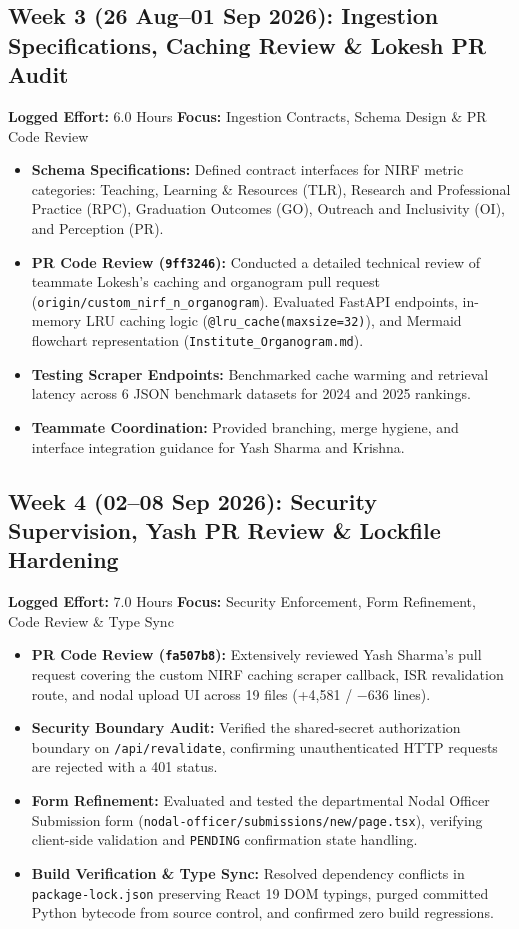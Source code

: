 \documentclass[11pt,a4paper]{article}
\begin{document}
\subsection*{Week 3 (26 Aug--01 Sep 2026): Ingestion Specifications, Caching Review \& Lokesh PR Audit}
\textbf{Logged Effort:} 6.0 Hours \quad \textbf{Focus:} Ingestion Contracts, Schema Design \& PR Code Review
\begin{itemize}[leftmargin=1.4em, itemsep=2pt]
\item \textbf{Schema Specifications:} Defined contract interfaces for NIRF metric categories: Teaching, Learning \& Resources (TLR), Research and Professional Practice (RPC), Graduation Outcomes (GO), Outreach and Inclusivity (OI), and Perception (PR).
\item \textbf{PR Code Review (\texttt{9ff3246}):} Conducted a detailed technical review of teammate Lokesh's caching and organogram pull request (\texttt{origin/custom\_nirf\_n\_organogram}). Evaluated FastAPI endpoints, in-memory LRU caching logic (\texttt{@lru\_cache(maxsize=32)}), and Mermaid flowchart representation (\texttt{Institute\_Organogram.md}).
\item \textbf{Testing Scraper Endpoints:} Benchmarked cache warming and retrieval latency across 6 JSON benchmark datasets for 2024 and 2025 rankings.
\item \textbf{Teammate Coordination:} Provided branching, merge hygiene, and interface integration guidance for Yash Sharma and Krishna.
\end{itemize}

\subsection*{Week 4 (02--08 Sep 2026): Security Supervision, Yash PR Review \& Lockfile Hardening}
\textbf{Logged Effort:} 7.0 Hours \quad \textbf{Focus:} Security Enforcement, Form Refinement, Code Review \& Type Sync
\begin{itemize}[leftmargin=1.4em, itemsep=2pt]
\item \textbf{PR Code Review (\texttt{fa507b8}):} Extensively reviewed Yash Sharma's pull request covering the custom NIRF caching scraper callback, ISR revalidation route, and nodal upload UI across 19 files (+4,581 / $-$636 lines).
\item \textbf{Security Boundary Audit:} Verified the shared-secret authorization boundary on \texttt{/api/revalidate}, confirming unauthenticated HTTP requests are rejected with a 401 status.
\item \textbf{Form Refinement:} Evaluated and tested the departmental Nodal Officer Submission form (\texttt{nodal-officer/submissions/new/page.tsx}), verifying client-side validation and \texttt{PENDING} confirmation state handling.
\item \textbf{Build Verification \& Type Sync:} Resolved dependency conflicts in \texttt{package-lock.json} preserving React 19 DOM typings, purged committed Python bytecode from source control, and confirmed zero build regressions.
\end{itemize}
\end{document}
